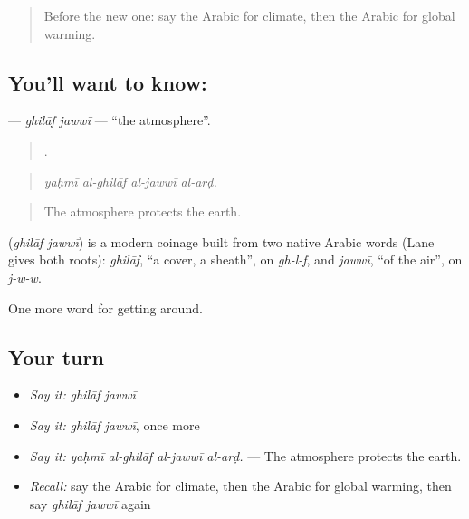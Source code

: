 \label{lesson:AR-C463-ghilaf-jawwi}



\begin{quote}
Before the new one: say the Arabic for climate, then the Arabic for global warming.
\end{quote}

\subsection*{You'll want to know:  }
\textbf{ } — \emph{ghilāf jawwī} — \textquotedblleft{}the atmosphere\textquotedblright{}.

\begin{quote}
   .
\end{quote}

\begin{quote}
\emph{yaḥmī al-ghilāf al-jawwī al-arḍ.}
\end{quote}

\begin{quote}
The atmosphere protects the earth.
\end{quote}

\begin{cousinweb}
\textbf{ } (\emph{ghilāf jawwī}) is a modern coinage built from two native Arabic words (Lane gives both roots): \emph{ghilāf}, \textquotedblleft{}a cover, a sheath\textquotedblright{}, on \emph{gh-l-f}, and \emph{jawwī}, \textquotedblleft{}of the air\textquotedblright{}, on \emph{j-w-w}.
\end{cousinweb}

\begin{grammarlens}[title={What you've built}]
One more word for getting around.
\end{grammarlens}

\subsection*{Your turn}
\begin{itemize}
\raggedright
  \item \emph{Say it:} \emph{ghilāf jawwī}
  \item \emph{Say it:} \emph{ghilāf jawwī}, once more
  \item \emph{Say it:} \emph{yaḥmī al-ghilāf al-jawwī al-arḍ.} — The atmosphere protects the earth.
  \item \emph{Recall:} say the Arabic for climate, then the Arabic for global warming, then say \emph{ghilāf jawwī} again
\end{itemize}

